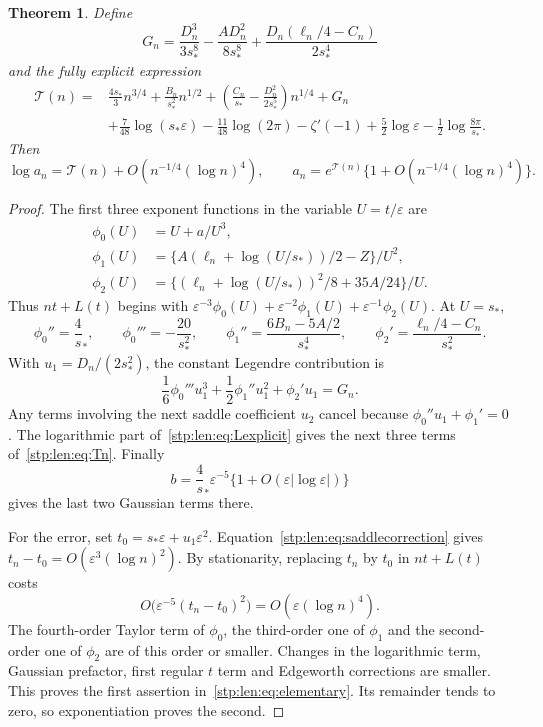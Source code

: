 \documentclass[11pt]{article}
\newtheorem{theorem}{Theorem}[section]
\theoremstyle{remark}\newtheorem{remark}[theorem]{Remark}
\newcommand{\as}{s_*}\newcommand{\eps}{\varepsilon}\newcommand{\poc}[2]{(#1;#2)_\infty}
\begin{document}
\begin{theorem}\label{stp:len:thm:elementary}
Define
\begin{equation}\label{stp:len:eq:Gn}
 G_n=\frac{D_n^3}{3\as^8}-\frac{AD_n^2}{8\as^8}
     +\frac{D_n(\ell_n/4-C_n)}{2\as^4}
\end{equation}
and the fully explicit expression
\begin{equation}\label{stp:len:eq:Tn}
\begin{split}
 \mathcal T(n)={}&\frac{4\as}{3}n^{3/4}+\frac{B_n}{\as^2}n^{1/2}
 +\left(\frac{C_n}{\as}-\frac{D_n^2}{2\as^5}\right)n^{1/4}+G_n\\
 &+\frac7{48}\log(\as\eps)-\frac{11}{48}\log(2\pi)-\zeta'(-1)
   +\frac52\log\eps-\frac12\log\frac{8\pi}{\as}.
\end{split}
\end{equation}
Then
\begin{equation}\label{stp:len:eq:elementary}
 \log a_n=\mathcal T(n)+O(n^{-1/4}(\log n)^4),\qquad
 a_n=e^{\mathcal T(n)}\{1+O(n^{-1/4}(\log n)^4)\}.
\end{equation}
\end{theorem}
\begin{proof}
The first three exponent functions in the variable $U=t/\eps$ are
\begin{align*}
 \phi_0(U)&=U+a/U^3,\\
 \phi_1(U)&=\{A(\ell_n+\log(U/\as))/2-Z\}/U^2,\\
 \phi_2(U)&=\{(\ell_n+\log(U/\as))^2/8+35A/24\}/U.
\end{align*}
Thus $nt+L(t)$ begins with $\eps^{-3}\phi_0(U)+\eps^{-2}\phi_1(U)+\eps^{-1}\phi_2(U)$. At $U=\as$,
\[
 \phi_0''=\frac4\as,\qquad \phi_0'''=-\frac{20}{\as^2},\qquad
 \phi_1''=\frac{6B_n-5A/2}{\as^4},\qquad
 \phi_2'=\frac{\ell_n/4-C_n}{\as^2}.
\]
With $u_1=D_n/(2\as^2)$, the constant Legendre contribution is
\[
 \frac16\phi_0'''u_1^3+\frac12\phi_1''u_1^2+\phi_2'u_1=G_n.
\]
Any terms involving the next saddle coefficient $u_2$ cancel because $\phi_0''u_1+\phi_1'=0$. The logarithmic part of~\eqref{stp:len:eq:Lexplicit} gives the next three terms of~\eqref{stp:len:eq:Tn}. Finally
\[
 b=\frac4\as\eps^{-5}\{1+O(\eps|\log\eps|)\}
\]
gives the last two Gaussian terms there.

For the error, set $t_0=\as\eps+u_1\eps^2$. Equation~\eqref{stp:len:eq:saddlecorrection} gives $t_n-t_0=O(\eps^3(\log n)^2)$. By stationarity, replacing $t_n$ by $t_0$ in $nt+L(t)$ costs
\[
 O\bigl(\eps^{-5}(t_n-t_0)^2\bigr)=O(\eps(\log n)^4).
\]
The fourth-order Taylor term of $\phi_0$, the third-order one of $\phi_1$ and the second-order one of $\phi_2$ are of this order or smaller. Changes in the logarithmic term, Gaussian prefactor, first regular $t$ term and Edgeworth corrections are smaller. This proves the first assertion in~\eqref{stp:len:eq:elementary}. Its remainder tends to zero, so exponentiation proves the second.
\end{proof}
\end{document}
